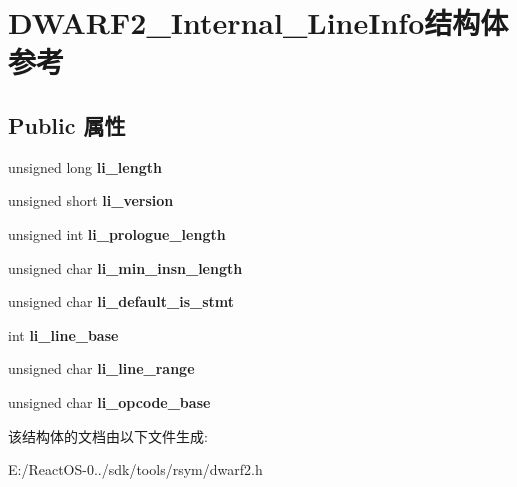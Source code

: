 \hypertarget{struct_d_w_a_r_f2___internal___line_info}{}\section{D\+W\+A\+R\+F2\+\_\+\+Internal\+\_\+\+Line\+Info结构体 参考}
\label{struct_d_w_a_r_f2___internal___line_info}
\subsection*{Public 属性}
\begin{DoxyCompactItemize}
\item 
\mbox{\label{struct_d_w_a_r_f2___internal___line_info_a7f5b16532667df54d2bdca4089f037f7}} 
unsigned long {\bfseries li\+\_\+length}
\item 
\mbox{\label{struct_d_w_a_r_f2___internal___line_info_a09a1539ce8523620474780ecacad98ed}} 
unsigned short {\bfseries li\+\_\+version}
\item 
\mbox{\label{struct_d_w_a_r_f2___internal___line_info_a64ca81a5d8a06300967ba0f163154ad6}} 
unsigned int {\bfseries li\+\_\+prologue\+\_\+length}
\item 
\mbox{\label{struct_d_w_a_r_f2___internal___line_info_a0228822762e6453c3398f937741c6178}} 
unsigned char {\bfseries li\+\_\+min\+\_\+insn\+\_\+length}
\item 
\mbox{\label{struct_d_w_a_r_f2___internal___line_info_a83e61785949f15be4a8d5ca1b5ec8860}} 
unsigned char {\bfseries li\+\_\+default\+\_\+is\+\_\+stmt}
\item 
\mbox{\label{struct_d_w_a_r_f2___internal___line_info_a7ce6dd28e3a1dbe730e3a8fb2c69019f}} 
int {\bfseries li\+\_\+line\+\_\+base}
\item 
\mbox{\label{struct_d_w_a_r_f2___internal___line_info_ab7943512761cf7aca9fbf8484e63cc88}} 
unsigned char {\bfseries li\+\_\+line\+\_\+range}
\item 
\mbox{\label{struct_d_w_a_r_f2___internal___line_info_a9923f604c5dfe27920caf8464375502d}} 
unsigned char {\bfseries li\+\_\+opcode\+\_\+base}
\end{DoxyCompactItemize}


该结构体的文档由以下文件生成\+:\begin{DoxyCompactItemize}
\item 
E\+:/\+React\+O\+S-\/0../sdk/tools/rsym/dwarf2.\+h\end{DoxyCompactItemize}

